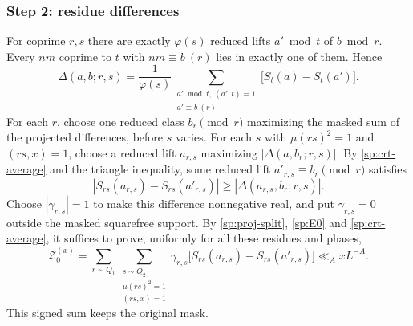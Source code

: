 \subsubsection*{Step 2: residue differences}
For coprime $r,s$ there are exactly $\varphi(s)$ reduced lifts
$a'\bmod t$ of $b\bmod r$. Every $nm$ coprime to $t$ with
$nm\equiv b\ (r)$ lies in exactly one of them. Hence
\begin{equation}\label{sp:crt-average}
 \Delta(a,b;r,s)=\frac1{\varphi(s)}\sum_{\substack{a'\bmod t,\ (a',t)=1\\a'\equiv b\ (r)}}
 \bigl[S_t(a)-S_t(a')\bigr].
\end{equation}
For each $r$, choose one reduced class $b_r\pmod r$ maximizing the
masked sum of the projected differences, before $s$ varies. For each
$s$ with $\mu(rs)^2=1$ and $(rs,x)=1$, choose a reduced lift $a_{r,s}$
maximizing $|\Delta(a,b_r;r,s)|$. By \eqref{sp:crt-average} and the triangle
inequality, some reduced lift $a'_{r,s}\equiv b_r\pmod r$ satisfies
\[
 |S_{rs}(a_{r,s})-S_{rs}(a'_{r,s})|
 \ge |\Delta(a_{r,s},b_r;r,s)|.
\]
Choose $|\gamma_{r,s}|=1$ to make this difference nonnegative real, and
put $\gamma_{r,s}=0$ outside the masked squarefree support. By
\eqref{sp:proj-split}, \eqref{sp:E0} and \eqref{sp:crt-average}, it suffices
to prove, uniformly for all these residues and phases,
\begin{equation}\label{sp:Z-target}
 \mathcal Z_0^{(x)}=
 \sum_{r\sim Q_1}
 \sum_{\substack{s\sim Q_2\\\mu(rs)^2=1\\(rs,x)=1}}
 \gamma_{r,s}\bigl[S_{rs}(a_{r,s})-S_{rs}(a'_{r,s})\bigr]
 \ll_AxL^{-A}.
\end{equation}
This signed sum keeps the original mask.

